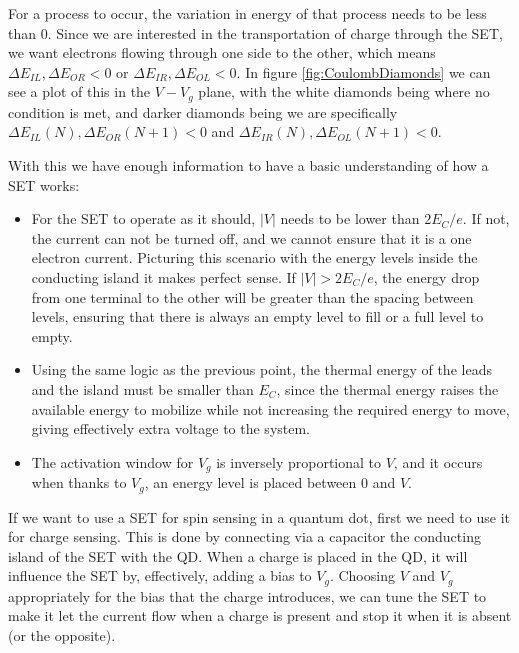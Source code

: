\documentclass[../main.tex]{subfiles}
\begin{document}
For a process to occur, the variation in energy of that process needs to be
less than \(0\). Since we are interested in the transportation of charge
through the SET, we want electrons flowing through one side to the other,
which means \(\Delta E_{IL}, \Delta E_{OR} < 0\) or
\(\Delta E_{IR}, \Delta E_{OL} < 0\). In figure \ref{fig:CoulombDiamonds}
we can see a plot of this in the \(V-V_{g}\) plane, with the white
diamonds being where no condition is met, and darker diamonds
being we are specifically \(\Delta E_{IL}(N), \Delta E_{OR}(N+1) < 0\) and
\(\Delta E_{IR}(N), \Delta E_{OL}(N+1) < 0\).

With this we have enough information to have a basic understanding of how a
SET works:
\begin{itemize}
    \item For the SET to operate as it should, \(|V|\) needs to be lower than
        \(2E_{C}/e\). If not, the current can not be turned off, and we cannot
        ensure that it is a one electron current. Picturing this scenario
        with the energy levels inside the conducting island it makes perfect
        sense. If \(|V| > 2E_{C}/e\), the energy drop from one terminal to the
        other will be greater than the spacing between levels, ensuring
        that there is always an empty level to fill or a full level to empty.
    \item Using the same logic as the previous point, the thermal energy of
        the leads and the island must be smaller than \(E_{C}\), since
        the thermal energy raises the available energy to mobilize while
        not increasing the required energy to move, giving effectively
        extra voltage to the system.
    \item The activation window for \(V_{g}\) is inversely proportional to
        \(V\), and it occurs when thanks to \(V_{g}\), an energy level
        is placed between \(0\) and \(V\).
\end{itemize}

If we want to use a SET for spin sensing in a quantum dot, first we need to
use it for charge sensing. This is done by connecting via a capacitor the
conducting island of the SET with the QD. When a charge is placed in the QD, it
will influence the SET by, effectively, adding a bias to \(V_{g}\). Choosing
\(V\) and \(V_{g}\) appropriately for the bias that the charge introduces, we
can tune the SET to make it let the current flow when a charge is present
and stop it when it is absent (or the opposite).
\end{document}
